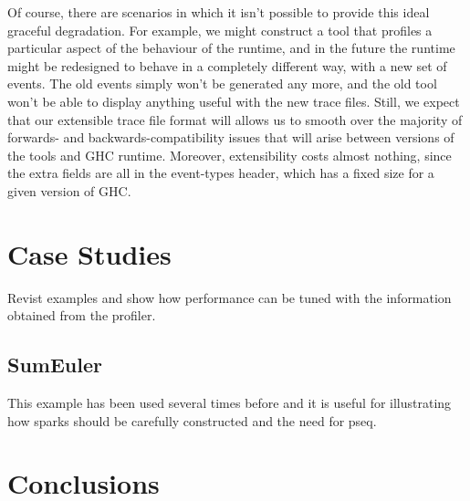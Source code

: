 \documentclass[twocolumn,9pt]{sigplanconf}
\begin{document}
Of course, there are scenarios in which it isn't possible to provide
this ideal graceful degradation.  For example, we might construct a
tool that profiles a particular aspect of the behaviour of the
runtime, and in the future the runtime might be redesigned to behave
in a completely different way, with a new set of events.  The old
events simply won't be generated any more, and the old tool won't be
able to display anything useful with the new trace files.  Still, we
expect that our extensible trace file format will allows us to smooth
over the majority of forwards- and backwards-compatibility issues that
will arise between versions of the tools and GHC runtime.  Moreover,
extensibility costs almost nothing, since the extra fields are all in
the event-types header, which has a fixed size for a given version of
GHC.

\section{Case Studies}
Revist examples and show how performance can be tuned with the information obtained from the profiler.

\subsection{SumEuler}
This example has been used several times before and it is useful for illustrating how sparks should be carefully constructed and the need for pseq.



\section{Conclusions}



\end{document}
